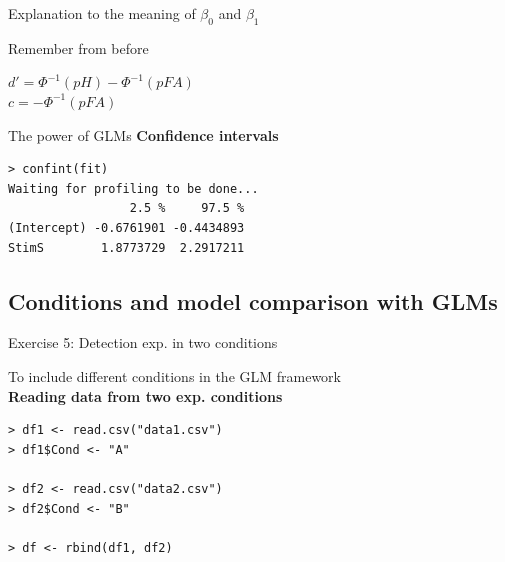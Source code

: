 \documentclass[10pt]{beamer}
\begin{document}
\begin{frame}{Explanation to the meaning of $\beta_0$ and $\beta_1$}
\begin{block}{Remember from before}
\begin{center}
$d'= \Phi^{-1}(pH) - \Phi^{-1}(pFA)$ \\
$c = -\Phi^{-1}(pFA)$
\end{center}
\end{block}

\end{frame}

\begin{frame}[fragile]{The power of GLMs}
\textbf{Confidence intervals}
\begin{verbatim}
> confint(fit)
Waiting for profiling to be done...
                 2.5 %     97.5 %
(Intercept) -0.6761901 -0.4434893
StimS        1.8773729  2.2917211
\end{verbatim}


\end{frame}


\subsection{Conditions and model comparison with GLMs}
\begin{frame}[fragile]{Exercise 5: Detection exp. in two conditions}

To include different conditions in the GLM framework \\[10pt]

\textbf{Reading data from two exp. conditions}
\begin{verbatim}
> df1 <- read.csv("data1.csv")
> df1$Cond <- "A"

> df2 <- read.csv("data2.csv")
> df2$Cond <- "B"

> df <- rbind(df1, df2)
\end{verbatim}
\end{frame}
\end{document}
